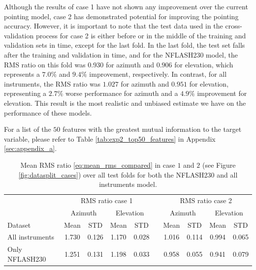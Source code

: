 Although the results of case 1 have not shown any improvement over the current pointing model, case 2 has demonstrated potential for improving the pointing accuracy.
However, it is important to note that the test data used in the cross-validation process for case 2 is either before or in the middle of the training and validation sets in time, except for the last fold.
In the last fold, the test set falls after the training and validation in time, and for the NFLASH230 model,
the RMS ratio on this fold was $0.930$ for azimuth and $0.906$ for elevation, which represents a $7.0\%$ and $9.4\%$ improvement, respectively.
In contrast, for all instruments, the RMS ratio was $1.027$ for azimuth and $0.951$ for elevation, representing a $2.7\%$ worse performance for azimuth and a $4.9\%$ improvement for elevation.
This result is the most realistic and unbiased estimate we have on the performance of these models.

For a list of the $50$ features with the greatest mutual information to the target variable, please refer to Table \ref{tab:exp2_top50_features} in Appendix \ref{sec:appendix_a}.

\begin{table}[!htbp]
    \centering %
    \caption[Mean RMS ratio for NFLASH230 and all instruments model]{
    Mean RMS ratio \eqref{eq:mean_rms_compared} in case $1$ and $2$ (see Figure \ref{fig:datasplit_cases}) over all test folds for both the NFLASH230 and all instruments model.}
    \begin{tabular}{lcccc c cccc}
        \toprule
        \multicolumn{1}{c}{} & \multicolumn{4}{c}{RMS ratio case 1} & & \multicolumn{4}{c}{RMS ratio case 2} \\
        \cmidrule(lr){2-5} \cmidrule(lr){7-10}
        \multicolumn{1}{c}{} & \multicolumn{2}{c}{Azimuth} & \multicolumn{2}{c}{Elevation} & & \multicolumn{2}{c}{Azimuth} & \multicolumn{2}{c}{Elevation} \\ 
        \cmidrule(lr){2-5} \cmidrule(lr){7-10}
        Dataset &  Mean &  STD &  Mean &  STD & & Mean &  STD &  Mean &  STD \\
        \midrule
        All instruments   &     1.730 &     0.126 &     1.170 &     0.028 &  &   1.016 &     0.114 &     0.994 &     0.065 \\
        Only NFLASH230    &     1.251 &     0.131 &     1.198 &     0.033 &  &   0.958 &     0.055 &     0.941 &     0.079 \\
        \bottomrule
    \end{tabular}
    \label{tab:results_minval_days04}
\end{table}



